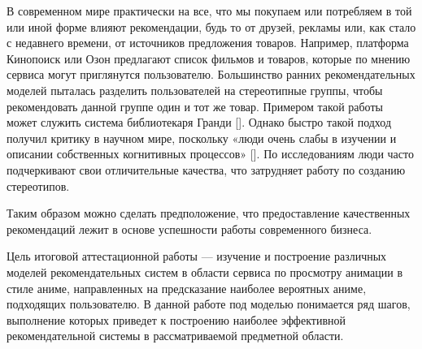 \documentclass[bachelor, och, diploma]{SCWorks}
\begin{document}


\tableofcontents

\abbreviations




\intro
В современном мире практически на все, что мы покупаем или потребляем в той или иной форме влияют рекомендации, будь то от друзей, рекламы или, как стало с недавнего времени, от источников предложения товаров. Например, платформа Кинопоиск или Озон предлагают список фильмов и товаров, которые по мнению сервиса могут приглянутся пользователю. 
Большинство ранних рекомендательных моделей пыталась разделить пользователей на стереотипные группы, чтобы рекомендовать данной группе один и тот же товар. Примером такой работы может служить система библиотекаря Гранди []. Однако быстро такой подход получил критику в научном мире, поскольку «люди очень слабы в изучении и описании собственных когнитивных процессов» []. По исследованиям люди часто подчеркивают свои отличительные качества, что затрудняет работу по созданию стереотипов.

Таким образом можно сделать предположение, что предоставление качественных рекомендаций лежит в основе успешности работы современного бизнеса. 

Цель итоговой аттестационной работы --- изучение и построение различных моделей рекомендательных систем в области сервиса по просмотру анимации в стиле аниме, направленных на предсказание наиболее вероятных аниме, подходящих пользователю. В данной работе под моделью понимается ряд шагов, выполнение которых приведет к построению наиболее эффективной рекомендательной системы в рассматриваемой предметной области. 
\end{document}
